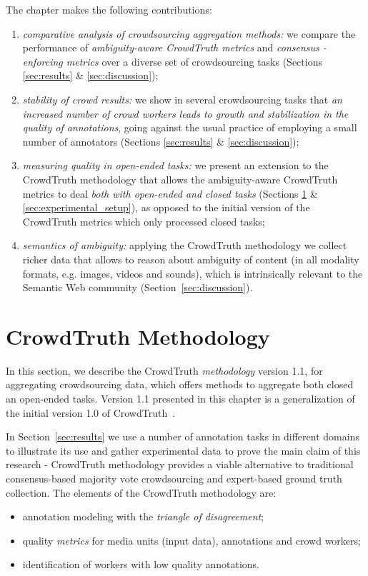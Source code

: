 The chapter makes the following contributions:

\begin{enumerate}

\item \textit{comparative analysis of crowdsourcing aggregation methods:} we compare the performance of \textit{ambiguity-aware CrowdTruth metrics} and \textit{consensus - enforcing metrics} over a diverse set of crowdsourcing tasks (Sections \ref{sec:results} \& \ref{sec:discussion});

\item \textit{stability of crowd results:} we show in several crowdsourcing tasks that \textit{an increased number of crowd workers leads to growth and stabilization in the quality of annotations}, going against the usual practice of employing a small number of annotators (Sections \ref{sec:results} \& \ref{sec:discussion});

\item \textit{measuring quality in open-ended tasks:} we present an extension to the CrowdTruth methodology that allows the ambiguity-aware CrowdTruth metrics to deal \textit{both with open-ended and closed tasks} (Sections \ref{sec:methodology} \& \ref{sec:experimental_setup}), as opposed to the initial version of the CrowdTruth metrics which only processed closed tasks;

\item \textit{semantics of ambiguity:} applying the CrowdTruth methodology we collect richer data that allows to reason about ambiguity of content (in all modality formats, e.g. images, videos and sounds), which is intrinsically relevant to the Semantic Web community (Section~\ref{sec:discussion}).

\end{enumerate}


\section{CrowdTruth Methodology}
\label{sec:methodology}

In this section, we describe the CrowdTruth \textit{methodology} version 1.1, for aggregating crowdsourcing data, which offers methods to aggregate both closed an open-ended tasks. Version 1.1 presented in this chapter is a generalization of the initial version 1.0 of CrowdTruth~\cite{inel2014crowdtruth}.

In Section~\ref{sec:results} we use a number of annotation tasks in different domains  to illustrate its use and gather experimental data to prove the main claim of this research - CrowdTruth methodology provides a viable alternative to traditional consensus-based majority vote crowdsourcing and expert-based ground truth collection. The elements of the CrowdTruth methodology are:
\begin{itemize}
\item annotation modeling with the \emph{triangle of disagreement};
\item quality \emph{metrics} for media units (input data), annotations and crowd workers;
\item identification of workers with low quality annotations.
\end{itemize}

